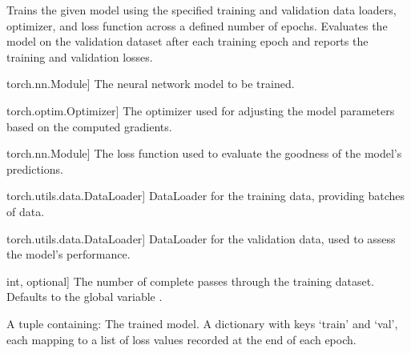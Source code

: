 \documentclass[letterpaper,10pt,english]{sphinxmanual}
\begin{document}
\begin{fulllineitems}
\label{\detokenize{insur_FL_client:insur_FL_client.train}}
\pysigstartsignatures
{}
\pysigstopsignatures
\sphinxAtStartPar
Trains the given model using the specified training and validation data loaders, optimizer, and loss function
across a defined number of epochs. Evaluates the model on the validation dataset after each training epoch and
reports the training and validation losses.
\begin{description}
\begin{description}
\sphinxlineitem{model}{[}torch.nn.Module{]}
\sphinxAtStartPar
The neural network model to be trained.

\sphinxlineitem{optimizer}{[}torch.optim.Optimizer{]}
\sphinxAtStartPar
The optimizer used for adjusting the model parameters based on the computed gradients.

\sphinxlineitem{criterion}{[}torch.nn.Module{]}
\sphinxAtStartPar
The loss function used to evaluate the goodness of the model’s predictions.

\sphinxlineitem{train\_loader}{[}torch.utils.data.DataLoader{]}
\sphinxAtStartPar
DataLoader for the training data, providing batches of data.

\sphinxlineitem{val\_loader}{[}torch.utils.data.DataLoader{]}
\sphinxAtStartPar
DataLoader for the validation data, used to assess the model’s performance.

\sphinxlineitem{epochs}{[}int, optional{]}
\sphinxAtStartPar
The number of complete passes through the training dataset. Defaults to the global variable .

\end{description}

\begin{description}
\sphinxAtStartPar
A tuple containing:
\sphinxhyphen{} The trained model.
\sphinxhyphen{} A dictionary with keys ‘train’ and ‘val’, each mapping to a list of loss values recorded at the end of each epoch.


\end{description}
\end{description}
\end{fulllineitems}
\end{document}
